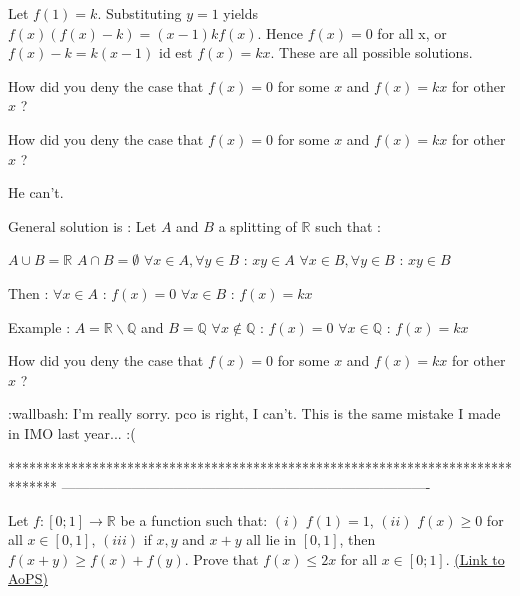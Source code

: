 \begin{solution}
	\begin{tcolorbox}Let $ f(1) = k$. Substituting $ y = 1$ yields $ f(x)(f(x) - k) = (x - 1)kf(x)$. Hence $ f(x) = 0$ for all x, or $ f(x) - k = k(x - 1)$ id est $ f(x) = kx$. These are all possible solutions.\end{tcolorbox}

How did you deny the case that $ f(x)=0$ for some $ x$ and $ f(x)=kx$ for other $ x$ ?
\end{solution}



\begin{solution}
	\begin{tcolorbox} How did you deny the case that $ f(x) = 0$ for some $ x$ and $ f(x) = kx$ for other $ x$ ?\end{tcolorbox}

He can't.

General solution is :
Let $ A$ and $ B$ a splitting of $ \mathbb R$ such that :

$ A\cup B = \mathbb R$
$ A\cap B = \emptyset$
$ \forall x\in A, \forall y\in B$ : $ xy\in A$
$ \forall x\in B, \forall y\in B$ : $ xy\in B$

Then :
$ \forall x\in A$ : $ f(x) = 0$
$ \forall x\in B$ : $ f(x) = kx$

Example : $ A = \mathbb R\backslash \mathbb Q$ and $ B = \mathbb Q$
$ \forall x\notin \mathbb Q$ : $ f(x) = 0$
$ \forall x\in \mathbb Q$ : $ f(x) = kx$
\end{solution}



\begin{solution}
	\begin{tcolorbox}How did you deny the case that $ f(x) = 0$ for some $ x$ and $ f(x) = kx$ for other $ x$ ?\end{tcolorbox}

 :wallbash:  I'm really sorry. pco is right, I can't. This is the same mistake I made in IMO last year... :(
\end{solution}
*******************************************************************************
-------------------------------------------------------------------------------

\begin{problem}
	Let $ f: [0;1] \rightarrow \mathbb{R}$ be a function such that:
$ (i)$ $ f(1) = 1$,
$ (ii)$ $ f(x) \ge 0$ for all $ x \in [0,1]$,
$ (iii)$ if $ x,y$ and $ x + y$ all lie in $ [0,1]$, then $ f(x + y) \ge f(x) + f(y)$.
Prove that $ f(x) \le 2x$ for all $ x \in [0;1]$.
	\flushright \href{https://artofproblemsolving.com/community/c6h281056}{(Link to AoPS)}
\end{problem}



